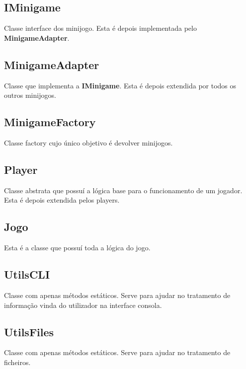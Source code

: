 \documentclass[11pt]{article}
\begin{document}
	
	\large
	\subsection{IMinigame}
	\normalsize
	
	Classe interface dos minijogo. Esta é depois implementada pelo \textbf{MinigameAdapter}.
	
	
	\large
	\subsection{MinigameAdapter}
	\normalsize
	
	Classe que implementa a \textbf{IMinigame}. Esta é depois extendida por todos os outros minijogos.
	
	
	\large
	\subsection{MinigameFactory}
	\normalsize
	
	Classe factory cujo único objetivo é devolver minijogos.
	
	
	\large
	\subsection{Player}
	\normalsize
	
	Classe abstrata que possuí a lógica base para o funcionamento de um jogador. Esta é depois extendida pelos players.
	
	\large
	\subsection{Jogo}
	\normalsize
	
	Esta é a classe que possuí toda a lógica do jogo.
	
	
	\large
	\subsection{UtilsCLI}
	\normalsize
	
	Classe com apenas métodos estáticos. Serve para ajudar no tratamento de informação vinda do utilizador na interface consola.
	
	
	\large
	\subsection{UtilsFiles}
	\normalsize
	
	Classe com apenas métodos estáticos. Serve para ajudar no tratamento de ficheiros.
	
\end{document}
